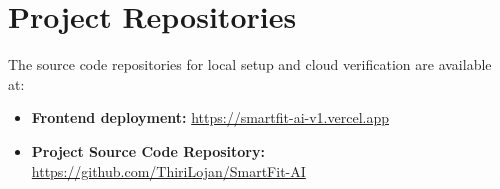 \section{Project Repositories}
The source code repositories for local setup and cloud verification are available at:
\begin{itemize}
    \item \textbf{Frontend deployment:} \url{https://smartfit-ai-v1.vercel.app}
    \item \textbf{Project Source Code Repository:} \url{https://github.com/ThiriLojan/SmartFit-AI}
\end{itemize}
\newpage
